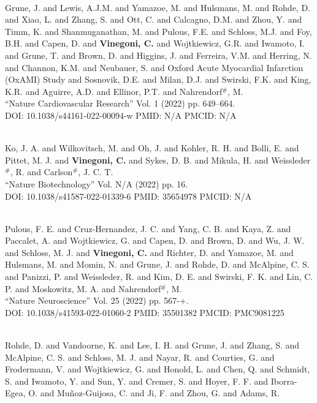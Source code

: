 \item {} \\ Grune, J. and Lewis, A.J.M. and Yamazoe, M. and Hulsmans, M. and Rohde, D. and Xiao, L. and Zhang, S. and Ott, C. and Calcagno, D.M. and Zhou, Y. and Timm, K. and Shanmuganathan, M. and Pulous, F.E. and Schloss, M.J. and Foy, B.H. and Capen, D. and {\bf Vinegoni, C.} and Wojtkiewicz, G.R. and Iwamoto, I. and Grune, T. and Brown, D. and Higgins, J. and Ferreira, V.M. and Herring, N. and Channon, K.M. and Neubauer, S. and Oxford Acute Myocardial Infarction (OxAMI) Study and Sosnovik, D.E. and Milan, D.J. and Swirski, F.K. and King, K.R. and Aguirre, A.D. and Ellinor, P.T. and Nahrendorf$^\#$, M. \\ ``Nature Cardiovascular Research'' Vol. 1 (2022) pp. 649–664. \\ DOI: 10.1038/s44161-022-00094-w PMID: N/A PMCID: N/A\item {} \\ Ko, J. A. and Wilkovitsch, M. and Oh, J. and Kohler, R. H. and Bolli, E. and Pittet, M. J. and {\bf Vinegoni, C.} and Sykes, D. B. and Mikula, H. and Weissleder$^\#$, R. and Carlson$^\#$, J. C. T. \\ ``Nature Biotechnology'' Vol. N/A (2022) pp. 16. \\ DOI: 10.1038/s41587-022-01339-6 PMID: 35654978 PMCID: N/A\item {} \\ Pulous, F. E. and Cruz-Hernandez, J. C. and Yang, C. B. and Kaya, Z. and Paccalet, A. and Wojtkiewicz, G. and Capen, D. and Brown, D. and Wu, J. W. and Schloss, M. J. and {\bf Vinegoni, C.} and Richter, D. and Yamazoe, M. and Hulsmans, M. and Momin, N. and Grune, J. and Rohde, D. and McAlpine, C. S. and Panizzi, P. and Weissleder, R. and Kim, D. E. and Swirski, F. K. and Lin, C. P. and Moskowitz, M. A. and Nahrendorf$^\#$, M. \\ ``Nature Neuroscience'' Vol. 25 (2022) pp. 567-+. \\ DOI: 10.1038/s41593-022-01060-2 PMID: 35501382 PMCID: PMC9081225\item {} \\ Rohde, D. and Vandoorne, K. and Lee, I. H. and Grune, J. and Zhang, S. and McAlpine, C. S. and Schloss, M. J. and Nayar, R. and Courties, G. and Frodermann, V. and Wojtkiewicz, G. and Honold, L. and Chen, Q. and Schmidt, S. and Iwamoto, Y. and Sun, Y. and Cremer, S. and Hoyer, F. F. and Iborra-Egea, O. and Muñoz-Guijosa, C. and Ji, F. and Zhou, G. and Adams, R. 